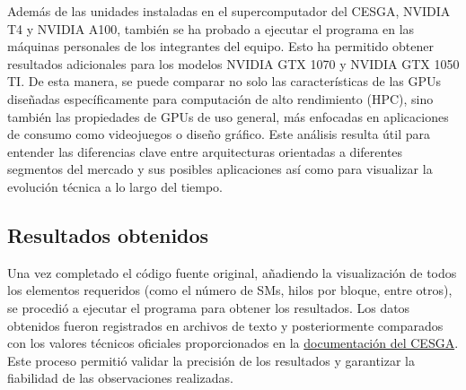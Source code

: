 \documentclass{article}
\begin{document}
		Además de las unidades instaladas en el supercomputador del CESGA, NVIDIA T4 y NVIDIA A100, también se ha probado a ejecutar el programa en las máquinas personales de los integrantes del equipo. Esto ha permitido obtener resultados adicionales para los modelos NVIDIA GTX 1070 y NVIDIA GTX 1050 TI. De esta manera, se puede comparar no solo las características de las GPUs diseñadas específicamente para computación de alto rendimiento (HPC), sino también las propiedades de GPUs de uso general, más enfocadas en aplicaciones de consumo como videojuegos o diseño gráfico. Este análisis resulta útil para entender las diferencias clave entre arquitecturas orientadas a diferentes segmentos del mercado y sus posibles aplicaciones así como para visualizar la evolución técnica a lo largo del tiempo.

	\subsection{Resultados obtenidos}

		Una vez completado el código fuente original, añadiendo la visualización de todos los elementos requeridos (como el número de SMs, hilos por bloque, entre otros), se procedió a ejecutar el programa para obtener los resultados. Los datos obtenidos fueron registrados en archivos de texto y posteriormente comparados con los valores técnicos oficiales proporcionados en la \href{https://cesga-docs.gitlab.io/ft3-user-guide/gpu_nodes.html}{documentación del CESGA}. Este proceso permitió validar la precisión de los resultados y garantizar la fiabilidad de las observaciones realizadas.
\end{document}
